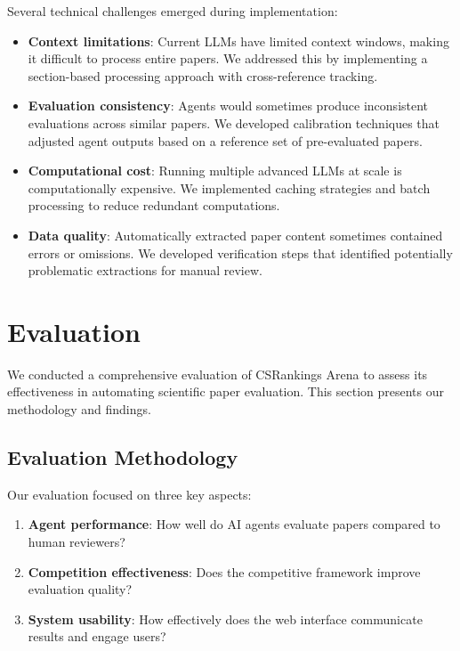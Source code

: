 \documentclass[conference]{IEEEtran}
\begin{document}
Several technical challenges emerged during implementation:

\begin{itemize}
    \item \textbf{Context limitations}: Current LLMs have limited context windows, making it difficult to process entire papers. We addressed this by implementing a section-based processing approach with cross-reference tracking.
    
    \item \textbf{Evaluation consistency}: Agents would sometimes produce inconsistent evaluations across similar papers. We developed calibration techniques that adjusted agent outputs based on a reference set of pre-evaluated papers.
    
    \item \textbf{Computational cost}: Running multiple advanced LLMs at scale is computationally expensive. We implemented caching strategies and batch processing to reduce redundant computations.
    
    \item \textbf{Data quality}: Automatically extracted paper content sometimes contained errors or omissions. We developed verification steps that identified potentially problematic extractions for manual review.
\end{itemize}

\section{Evaluation}
We conducted a comprehensive evaluation of CSRankings Arena to assess its effectiveness in automating scientific paper evaluation. This section presents our methodology and findings.

\subsection{Evaluation Methodology}
Our evaluation focused on three key aspects:

\begin{enumerate}
    \item \textbf{Agent performance}: How well do AI agents evaluate papers compared to human reviewers?
    \item \textbf{Competition effectiveness}: Does the competitive framework improve evaluation quality?
    \item \textbf{System usability}: How effectively does the web interface communicate results and engage users?
\end{enumerate}
\end{document}
